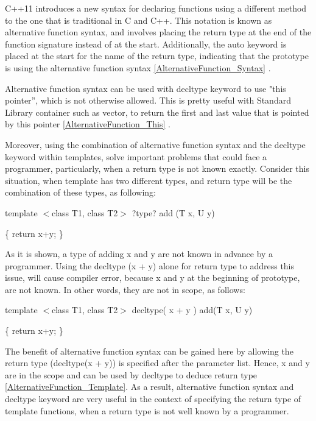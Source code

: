 \documentclass[11pt]{report}
\begin{document}
\begin{enumerate}
C++11 introduces a new syntax for declaring functions using a different method to the one that is traditional in C and C++. This notation is known as alternative function syntax, and involves placing the return type at the end of the function signature instead of at the start. Additionally, the auto keyword is placed at the start for the name of the return type, indicating that the prototype is using the alternative function syntax \ref{AlternativeFunction_Syntax} \cite{Gregorie:professionalcpp}.
\newline

Alternative function syntax can be used with decltype keyword to use "this pointer”, which is not otherwise allowed. This is pretty useful with Standard Library container such as vector, to return the first and last value that is pointed by this pointer \ref{AlternativeFunction_This} \cite{ISO:2011:Cpplanguage}. 
\newline

Moreover, using the combination of alternative function syntax and the decltype keyword within templates, solve important problems that could face a programmer, particularly, when a return type is not known exactly.  Consider this situation, when template has two different types, and return type will be the combination of these types, as following:
\begin{center}
template $<$class T1, class T2$>$  ?type? add (T x, U y) 
\newline

\{ return x+y; \}
\end{center}

As it is shown, a type of adding x and y are not known in advance by a programmer. Using the decltype (x + y) alone for return type to address this issue, will cause compiler error, because x and y at the beginning of prototype, are not known.  In other words, they are not in scope, as follows:

\begin{center}
template $<$class T1, class T2$>$  decltype( x + y ) add(T x, U y)
\newline

\{ return x+y; \}
\end{center}

The benefit of alternative function syntax can be gained here by allowing the return type (decltype(x + y)) is specified after the parameter list. Hence, x and y are in the scope and can be used by decltype to deduce return type \ref{AlternativeFunction_Template}. As a result, alternative function syntax and decltype keyword are very useful in the context of specifying the return type of template functions, when a return type is not well known by a programmer\cite{Prata:2012:Cpp}.
\newline


\end{enumerate}
\end{document}
